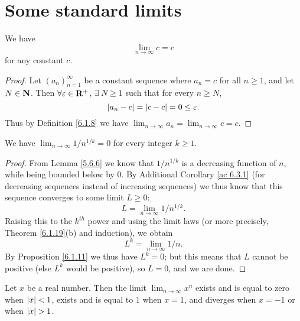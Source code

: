 \section{Some standard limits}\label{sec 6.5}

\begin{additional corollary}\label{ac 6.5.1}
We have
\[
    \lim_{n \to \infty} c = c
\]
for any constant \(c\).
\end{additional corollary}

\begin{proof}
    Let \((a_n)_{n = 1}^\infty\) be a constant sequence where \(a_n = c\) for all \(n \geq 1\), and let \(N \in \mathbf{N}\).
    Then \(\forall \varepsilon \in \mathbf{R}^+\), \(\exists\ N \geq 1\) such that for every \(n \geq N\),
    \[
        \left\lvert a_n - c\right\rvert = \left\lvert c - c\right\rvert = 0 \leq \varepsilon.
    \]
    Thus by Definition \ref{6.1.8} we have \(\lim_{n \to \infty} a_n = \lim_{n \to \infty} c = c\).
\end{proof}

\begin{corollary}\label{6.5.1}
    We have \(\lim_{n \to \infty} 1 / n^{1 / k} = 0\) for every integer \(k \geq 1\).
\end{corollary}

\begin{proof}
    From Lemma \ref{5.6.6} we know that \(1 / n^{1 / k}\) is a decreasing function of \(n\), while being bounded below by \(0\).
    By Additional Corollary \ref{ac 6.3.1} (for decreasing sequences instead of increasing sequences) we thus know that this sequence converges to some limit \(L \geq 0\):
    \[
        L = \lim_{n \to \infty} 1 / n^{1 / k}.
    \]
    Raising this to the \(k^{th}\) power and using the limit laws (or more precisely, Theorem \ref{6.1.19}(b) and induction), we obtain
    \[
        L^k = \lim_{n \to \infty} 1 / n.
    \]
    By Proposition \ref{6.1.11} we thus have \(L^k = 0\);
    but this means that \(L\) cannot be positive (else \(L^k\) would be positive), so \(L = 0\), and we are done.
\end{proof}

\begin{lemma}\label{6.5.2}
    Let \(x\) be a real number.
    Then the limit \(\lim_{n \to \infty} x^n\) exists and is equal to zero when \(\left\lvert x\right\rvert < 1\), exists and is equal to \(1\) when \(x = 1\), and diverges when \(x = -1\) or when \(\left\lvert x\right\rvert > 1\).
\end{lemma}

